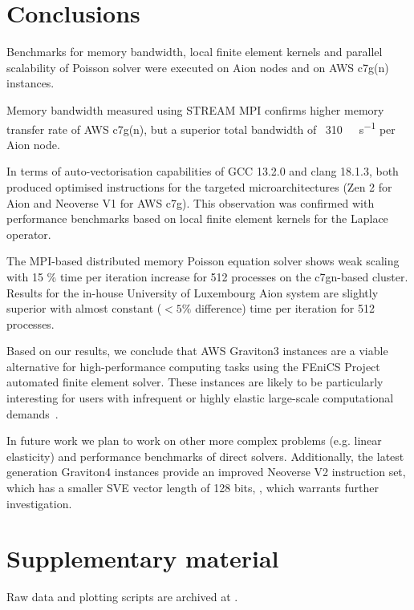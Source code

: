 \section*{Conclusions}

Benchmarks for memory bandwidth, local finite element kernels and parallel
scalability of Poisson solver were executed on Aion nodes and on AWS c7g(n)
instances.

Memory bandwidth measured using STREAM MPI confirms higher memory transfer rate
of AWS c7g(n), but a superior total bandwidth of
~\SI{310}{\giga\byte\per\second} per Aion node.

In terms of auto-vectorisation capabilities of GCC 13.2.0 and clang 18.1.3, both
produced optimised instructions for the targeted microarchitectures (Zen 2 for
Aion and Neoverse V1 for AWS c7g). This observation was confirmed with
performance benchmarks based on local finite element kernels for the Laplace
operator.

The MPI-based distributed memory Poisson equation solver shows weak scaling with
15 \% time per iteration increase for 512 processes on the c7gn-based cluster.
Results for the in-house University of Luxembourg Aion system are slightly
superior with almost constant ($< 5 \%$ difference) time per iteration for 512
processes.

Based on our results, we conclude that AWS Graviton3 instances are a viable
alternative for high-performance computing tasks using the FEniCS Project
automated finite element solver. These instances are likely to be particularly
interesting for users with infrequent or highly elastic large-scale
computational demands~\cite{emeras_amazon_2016}.

In future work we plan to work on other more complex problems (e.g. linear
elasticity) and performance benchmarks of direct solvers. Additionally, the
latest generation Graviton4 instances provide an improved Neoverse V2
instruction set, which has a smaller SVE vector length of 128 bits,
\citep{ArmReferenceManualNeoverseV2}, which warrants further investigation.

\section*{Supplementary material}
Raw data and plotting scripts are archived at \citep{habera_2024_13748405}.

